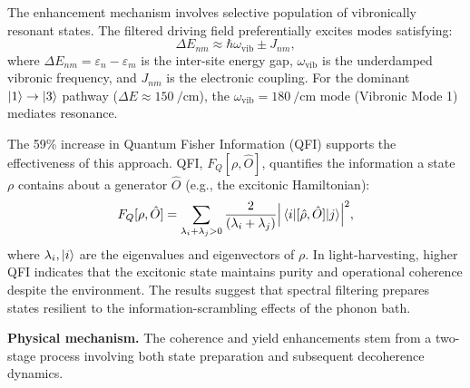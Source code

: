 \documentclass[journal=jpcl,manuscript=letter]{achemso}
\begin{document}
The enhancement mechanism involves selective population of vibronically resonant states. The filtered driving field preferentially excites modes satisfying:
\begin{equation}
\Delta E_{nm} \approx \hbar\omega_{\mathrm{vib}} \pm J_{nm},
\label{eq:resonance_condition}
\end{equation}
where $\Delta E_{nm} = \varepsilon_n - \varepsilon_m$ is the inter-site energy gap, $\omega_{\mathrm{vib}}$ is the underdamped vibronic frequency, and $J_{nm}$ is the electronic coupling. For the dominant $\ket{1} \to \ket{3}$ pathway ($\Delta E \approx \SI{150}{\per\centi\meter}$), the $\omega_{\mathrm{vib}} = \SI{180}{\per\centi\meter}$ mode (Vibronic Mode 1) mediates resonance.\cite{Chin2013,Fleming2015,Scholes2015}

The 59\% increase in Quantum Fisher Information (QFI) supports the effectiveness of this approach. QFI, $F_Q[\rho, \hat{O}]$, quantifies the information a state $\rho$ contains about a generator $\hat{O}$ (e.g., the excitonic Hamiltonian):
\begin{equation}
F_Q[\rho, \hat{O}] = \sum_{\lambda_i + \lambda_j > 0} \frac{2}{(\lambda_i + \lambda_j)} \abs{\mel{i}{[\hat{\rho}, \hat{O}]}{j}}^2,
\label{eq:QFI}
\end{equation}
where $\lambda_i, \ket{i}$ are the eigenvalues and eigenvectors of $\rho$. In light-harvesting, higher QFI indicates that the excitonic state maintains purity and operational coherence despite the environment.\cite{Pezze2009} The results suggest that spectral filtering prepares states resilient to the information-scrambling effects of the phonon bath.

\textbf{Physical mechanism.}
The coherence and yield enhancements stem from a two-stage process involving both state preparation and subsequent decoherence dynamics. 
\end{document}
